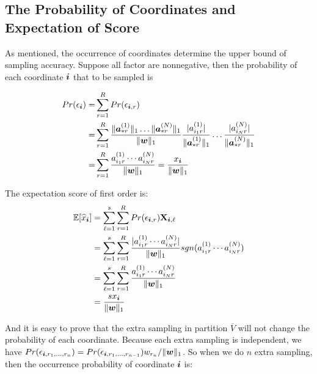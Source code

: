 \documentclass[letterpaper]{article}
\newcommand{\Sca}[3]{{#1}^{(#2)}_{i_#2#3}}%
\newcommand{\V}[1]{{\bm{{\MakeLowercase{#1}}}}}
\newcommand{\Vacol}[1]{\V{a}^{(#1)}_{*r}}
\newcommand{\M}[1]{{\bm{\mathbf{\MakeUppercase{#1}}}}}
\newcommand{\norm}[2]{\|#1\|_{#2}}
\begin{document}
\subsection{The Probability of Coordinates and Expectation of Score}

As mentioned, the occurrence of coordinates determine the upper bound of sampling accuracy. Suppose all factor are nonnegative, then the probability of each coordinate $\V{i}$ that to be sampled is

\begin{align*}
Pr(\epsilon_{\V{i}}) = &\sum_{r=1}^{R} Pr(\epsilon_{\V{i},r})\\
=& \sum_{r=1}^{R} \frac{\norm{\Vacol{1}}{1}\ldots\norm{\Vacol{N}}{1}}{\norm{\V{W}}{1}}\frac{|\Sca{a}{1}{r}|}{\norm{\Vacol{1}}{1}}\ldots \frac{|\Sca{a}{N}{r}|}{\norm{\Vacol{N}}{1}} \\
=& \sum_{r=1}^{R} \frac{\Sca{a}{1}{r}\cdots\Sca{a}{N}{r}}{\norm{\V{W}}{1}} = \frac{x_{\V{i}}}{\norm{\V{w}}{1}}
\end{align*}

The expectation score of first order is:
\begin{align*}
\mathbb{E}[\widehat{x}_{\V{i}}]& =\sum_{\ell=1}^{s}\sum_{r=1}^{R} Pr(\epsilon_{\V{i},r})\M{X}_{\V{i},\ell}\\
& = \sum_{\ell=1}^{s}\sum_{r=1}^{R} \frac{|\Sca{a}{1}{r}\cdots\Sca{a}{N}{r}|}{\norm{\V{W}}{1}}sgn(\Sca{a}{1}{r}\cdots\Sca{a}{N}{r})\\
& = \sum_{\ell=1}^{s}\sum_{r=1}^{R} \frac{\Sca{a}{1}{r}\cdots\Sca{a}{N}{r}}{\norm{\V{W}}{1}}\\
& = \frac{sx_{\V{i}}}{\norm{\V{w}}{1}}
\end{align*}


And it is easy to prove that the extra sampling in partition $\overline{V}$ will not change the probability of each coordinate.
Because each extra sampling is independent, we have $Pr(\epsilon_{\V{i},r_1,\ldots,r_n})=Pr(\epsilon_{\V{i},r_1,\ldots,r_{n-1}})w_{r_n}/\norm{\V{w}}{1}$.
So when we do $n$ extra sampling, then the occurrence probability of coordinate $\V{i}$ is:
\end{document}
